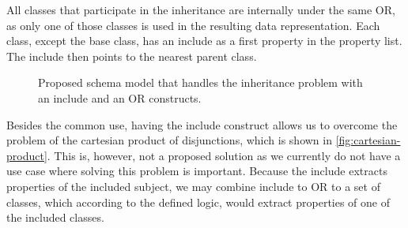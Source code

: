 
All classes that participate in the inheritance are internally under the same OR, as only one of those classes is used in the resulting data representation. Each class, except the base class, has an include as a first property in the property list. The include then points to the nearest parent class.

\begin{figure}[h!]\centering
  \centering

    \caption{Proposed schema model that handles the inheritance problem with an include and an OR constructs.}
    \label{fig:cartesian-product:include}
  \end{figure}

\bigskip

Besides the common use, having the include construct allows us to overcome the problem of the cartesian product of disjunctions, which is shown in \autoref{fig:cartesian-product}. This is, however, not a proposed solution as we currently do not have a use case where solving this problem is important. Because the include extracts properties of the included subject, we may combine include to OR to a set of classes, which according to the defined logic, would extract properties of one of the included classes.

